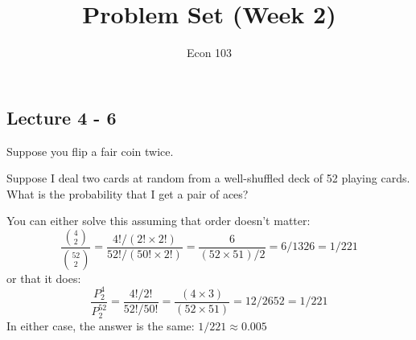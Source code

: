 \documentclass[addpoints,12pt]{exam}
\title{Problem Set (Week 2)}
\author{Econ 103}
\date{}
\begin{document}
\maketitle

\begin{questions}
\section*{Lecture 4 - 6}

\question Suppose you flip a fair coin twice.

\question Suppose I deal two cards at random from a well-shuffled deck of 52 playing cards. What is the probability that I get a pair of aces? 
	\begin{solution}
	You can either solve this assuming that order doesn't matter:
		$$\frac{\binom{4}{2}}{\binom{52}{2}} = \frac{4!/(2!\times 2!)}{52!/(50!  \times 2!)} = \frac{6}{(52\times 51)/2}= 6/1326 = 1/221$$
		or that it does:
		$$\frac{P^4_2}{P^{52}_2} = \frac{4!/2!}{52!/50!} =\frac{(4\times 3)}{(52\times 51)} = 12/2652 = 1/221$$
		In either case, the answer is the same: $1/221  \approx 0.005$
	\end{solution}




\end{questions}
\end{document}
